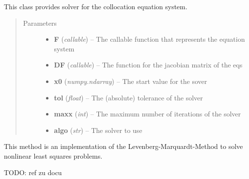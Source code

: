 \documentclass[letterpaper,10pt,english]{sphinxmanual}
\begin{document}
\begin{fulllineitems}
\label{pytrajectory:pytrajectory.solver.Solver}
This class provides solver for the collocation equation system.
\begin{quote}\begin{description}
\item[{Parameters}] \leavevmode\begin{itemize}
\item {} 
\textbf{F} (\emph{callable}) -- The callable function that represents the equation system

\item {} 
\textbf{DF} (\emph{callable}) -- The function for the jacobian matrix of the eqs

\item {} 
\textbf{x0} (\emph{numpy.ndarray}) -- The start value for the sover

\item {} 
\textbf{tol} (\emph{float}) -- The (absolute) tolerance of the solver

\item {} 
\textbf{maxx} (\emph{int}) -- The maximum number of iterations of the solver

\item {} 
\textbf{algo} (\emph{str}) -- The solver to use

\end{itemize}

\end{description}\end{quote}

\begin{fulllineitems}
\label{pytrajectory:pytrajectory.solver.Solver.gauss}
\end{fulllineitems}


\begin{fulllineitems}
\label{pytrajectory:pytrajectory.solver.Solver.leven}
This method is an implementation of the Levenberg-Marquardt-Method
to solve nonlinear least squares problems.

TODO: ref zu docu


\end{fulllineitems}
\end{fulllineitems}
\end{document}
